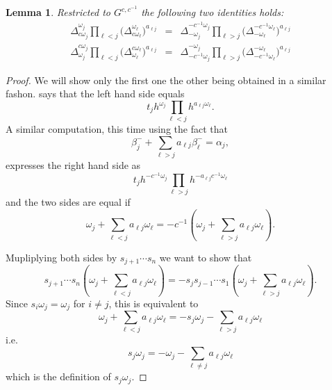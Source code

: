 \documentclass[12pt]{amsart}
\newtheorem{lemma}[theorem]{Lemma}
\theoremstyle{remark}
\numberwithin{equation}{section}
\begin{document}
\begin{lemma}
  Restricted to $G^{c,c^{-1}}$ the following two identities holds:
  \label{lemma:coefficients_identities}
  \begin{eqnarray}
    \Delta_{c\omega_j}^{\omega_j}
    \prod_{\ell<j}\big(\Delta_{c\omega_\ell}^{\omega_\ell}\big)^{a_{\ell j}}
    &=&
    \Delta_{-\omega_j}^{-c^{-1}\omega_j}
    \prod_{\ell>j}\big(\Delta_{-\omega_\ell}^{-c^{-1}\omega_\ell}\big)^{a_{\ell j}}\\
    \Delta_{\omega_j}^{c\omega_j}
    \prod_{\ell<j}\big(\Delta_{\omega_\ell}^{c\omega_\ell}\big)^{a_{\ell j}}
    &=&
    \Delta_{-c^{-1}\omega_j}^{-\omega_j}
    \prod_{\ell>j}\big(\Delta_{-c^{-1}\omega_\ell}^{-\omega_\ell}\big)^{a_{\ell j}}
  \end{eqnarray}
\end{lemma}
\begin{proof}
  We will show only the first one the other being obtained in a similar fashon.
   says that the left hand side equals
  \[
    t_j
    h^{\omega_j}
    \prod_{\ell<j}h^{a_{\ell j}\omega_\ell}.
  \]
  A similar computation, this time using the fact that 
  \[
    \beta_j^-+\sum_{\ell>j}a_{\ell j}\beta_\ell^-
    =
    \alpha_j,
  \]
  expresses the right hand side as
  \[
    t_j
    h^{-c^{-1}\omega_j}
    \prod_{\ell>j}h^{-a_{\ell j}c^{-1}\omega_\ell}
  \]
  and the two sides are equal if
  \begin{equation}
    \omega_j + \sum_{\ell<j} a_{\ell j}\omega_\ell
    =
    -c^{-1}\left(\omega_j + \sum_{\ell>j} a_{\ell j}\omega_\ell\right).
  \end{equation}
  
  Mupliplying both sides by $s_{j+1}\cdots s_n$ we want to show that
  \[
    s_{j+1}\cdots s_n\left(\omega_j + \sum_{\ell<j} a_{\ell j}\omega_\ell\right)=
    -s_js_{j-1}\cdots s_1\left(\omega_j + \sum_{\ell>j} a_{\ell j}\omega_\ell\right).
  \]
  Since $s_i\omega_j=\omega_j$ for $i\neq j$, this is equivalent to
  \[
    \omega_j + \sum_{\ell<j} a_{\ell j}\omega_\ell
    =
    -s_j\omega_j-\sum_{\ell>j} a_{\ell j}\omega_\ell
  \]
  i.e. 
  \begin{equation}
    s_j\omega_j
    =
    -\omega_j-\sum_{\ell\neq j}a_{\ell j}\omega_\ell
  \end{equation}
  which is the definition of $s_j\omega_j$.
\end{proof}
\end{document}
